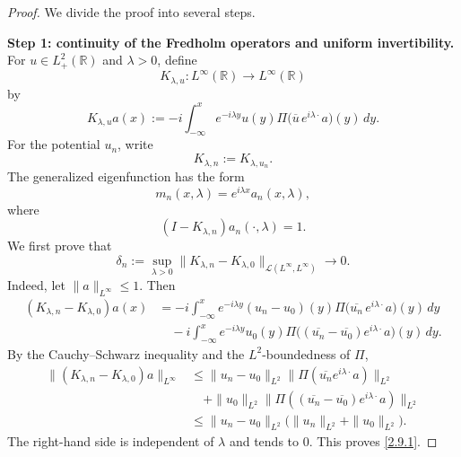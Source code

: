 \documentclass[10pt]{article}
\numberwithin{equation}{section}
\numberwithin{theorem}{section}
\begin{document}
\begin{proof}
We divide the proof into several steps.

\medskip
\noindent\textbf{Step 1: continuity of the Fredholm operators and uniform invertibility.}
For \(u\in L^2_+(\mathbb R)\) and \(\lambda>0\), define
\[
K_{\lambda,u}:L^\infty(\mathbb R)\to L^\infty(\mathbb R)
\]
by
\[
K_{\lambda,u}a(x)
:=
-i\int_{-\infty}^x
e^{-i\lambda y}u(y)
\Pi\bigl(\overline u\,e^{i\lambda\cdot}a\bigr)(y)\,dy .
\]
For the potential \(u_n\), write
\[
K_{\lambda,n}:=K_{\lambda,u_n}.
\]
The generalized eigenfunction has the form
\[
m_n(x,\lambda)=e^{i\lambda x}a_n(x,\lambda),
\]
where
\[
(I-K_{\lambda,n})a_n(\cdot,\lambda)=1.
\]
We first prove that
\begin{equation}
\label{2.9.1}
\delta_n:=
\sup_{\lambda>0}
\|K_{\lambda,n}-K_{\lambda,0}\|_{\mathcal L(L^\infty,L^\infty)}
\longrightarrow0 .
\end{equation}
Indeed, let \(\|a\|_{L^\infty}\le1\). Then
\[
\begin{aligned}
(K_{\lambda,n}-K_{\lambda,0})a(x)
&=
-i\int_{-\infty}^x
e^{-i\lambda y}(u_n-u_0)(y)
\Pi\bigl(\overline{u_n}\,e^{i\lambda\cdot}a\bigr)(y)\,dy  \\
&\quad
-i\int_{-\infty}^x
e^{-i\lambda y}u_0(y)
\Pi\bigl((\overline{u_n}-\overline{u_0})e^{i\lambda\cdot}a\bigr)(y)\,dy .
\end{aligned}
\]
By the Cauchy--Schwarz inequality and the \(L^2\)-boundedness of \(\Pi\),
\[
\begin{aligned}
\|(K_{\lambda,n}-K_{\lambda,0})a\|_{L^\infty}
&\le
\|u_n-u_0\|_{L^2}
\|\Pi(\overline{u_n}e^{i\lambda\cdot}a)\|_{L^2}  \\
&\quad
+\|u_0\|_{L^2}
\|\Pi((\overline{u_n}-\overline{u_0})e^{i\lambda\cdot}a)\|_{L^2}  \\
&\le
\|u_n-u_0\|_{L^2}
\bigl(\|u_n\|_{L^2}+\|u_0\|_{L^2}\bigr).
\end{aligned}
\]
The right-hand side is independent of \(\lambda\) and tends to \(0\). This proves
\eqref{2.9.1}.


\end{proof}
\end{document}
